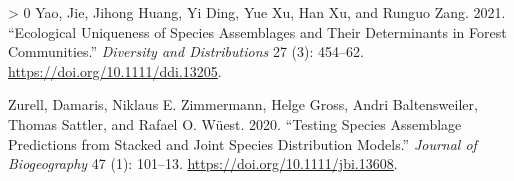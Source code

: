 \documentclass[10pt,oneside]{article}
\newlength{\cslhangindent}
\newenvironment{CSLReferences}[3] %
 {%
  \setlength{\parindent}{0pt}
  \ifodd #1 \everypar{\setlength{\hangindent}{\cslhangindent}}\ignorespaces\fi
  \ifnum #2 > 0
  \setlength{\parskip}{#2\baselineskip}
  \fi
 }%
 {}
\begin{document}
\begin{CSLReferences}{1}{0}
\leavevmode\hypertarget{ref-Yao2021EcoUni}{}%
Yao, Jie, Jihong Huang, Yi Ding, Yue Xu, Han Xu, and Runguo Zang. 2021.
{``Ecological Uniqueness of Species Assemblages and Their Determinants
in Forest Communities.''} \emph{Diversity and Distributions} 27 (3):
454--62. \url{https://doi.org/10.1111/ddi.13205}.

\leavevmode\hypertarget{ref-Zurell2020TesSpe}{}%
Zurell, Damaris, Niklaus E. Zimmermann, Helge Gross, Andri
Baltensweiler, Thomas Sattler, and Rafael O. Wüest. 2020. {``Testing
Species Assemblage Predictions from Stacked and Joint Species
Distribution Models.''} \emph{Journal of Biogeography} 47 (1): 101--13.
\url{https://doi.org/10.1111/jbi.13608}.

\end{CSLReferences}
\end{document}
